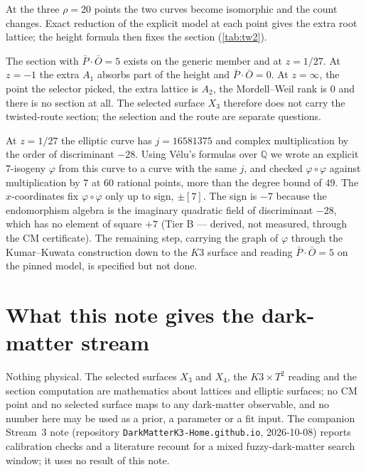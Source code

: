 \documentclass[11pt,a4paper]{article}
\theoremstyle{remark}
\newcommand{\tierB}{\colorbox{yellow!20}{\textsf{\scriptsize Tier B --- derived, not measured}}}
\begin{document}
At the three $\rho=20$ points the two curves become isomorphic and the count changes. Exact reduction of the
explicit model at each point gives the extra root lattice; the height formula then fixes the section
(\cref{tab:tw2}).

\begin{table}[h]
\centering

\caption{The section required by the $M_7$ polarization: generic member and the three $\rho=20$ points of
$s_7$. Root lattices from exact reduction of the explicit model; heights from Sch\"utt--Shioda
Thm.~11.5 (\tierB).}\label{tab:tw2}
\end{table}

\begin{headlinebox}
The section with $\bar P\cdot\bar O=5$ exists on the generic member and at $z=1/27$. At $z=-1$ the extra
$A_1$ absorbs part of the height and $\bar P\cdot\bar O=0$. At $z=\infty$, the point the selector picked, the
extra lattice is $A_2$, the Mordell--Weil rank is $0$ and there is no section at all. The selected surface
$X_3$ therefore does not carry the twisted-route section; the selection and the route are separate questions.
\end{headlinebox}

At $z=1/27$ the elliptic curve has $j=16581375$ and complex multiplication by the order of discriminant
$-28$. Using V\'elu's formulas over $\mathbb{Q}$ we wrote an explicit $7$-isogeny $\varphi$ from this curve to
a curve with the same $j$, and checked $\varphi\circ\varphi$ against multiplication by $7$ at $60$ rational
points, more than the degree bound of $49$. The $x$-coordinates fix $\varphi\circ\varphi$ only up to sign,
$\pm[7]$. The sign is $-7$ because the endomorphism algebra is the imaginary quadratic field of discriminant
$-28$, which has no element of square $+7$ (\tierB, through the CM certificate). The remaining step, carrying
the graph of $\varphi$ through the Kumar--Kuwata construction down to the $K3$ surface and reading
$\bar P\cdot\bar O=5$ on the pinned model, is specified but not done.

\section{What this note gives the dark-matter stream}\label{sec:stream3}

Nothing physical. The selected surfaces $X_3$ and $X_4$, the $K3\times T^2$ reading and the section
computation are mathematics about lattices and elliptic surfaces; no CM point and no selected surface maps to
any dark-matter observable, and no number here may be used as a prior, a parameter or a fit input. The
companion Stream~3 note (repository \texttt{DarkMatterK3-Home.github.io}, 2026-10-08) reports calibration
checks and a literature recount for a mixed fuzzy-dark-matter search window; it uses no result of this note.
\end{document}
